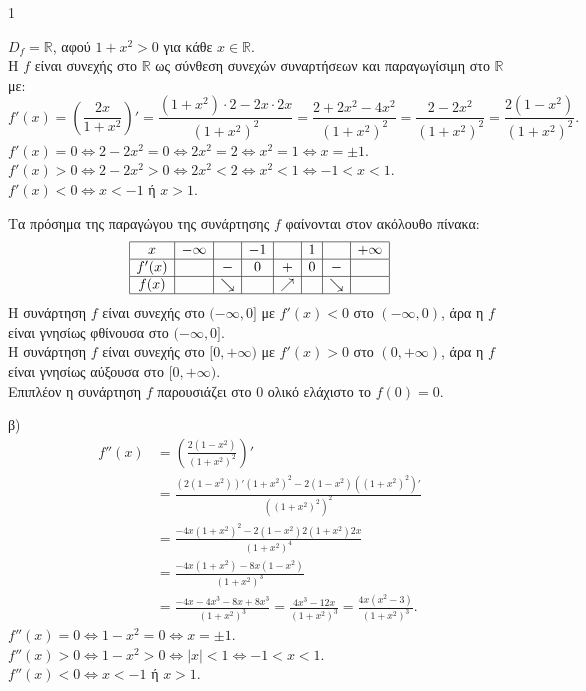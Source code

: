\begin{ylh}{1}
    \item [Ύλη από εικόνα]
\end{ylh}
$D_f = \mathbb{R}$, αφού $1+x^2 > 0$ για κάθε $x \in \mathbb{R}$. \\
Η $f$ είναι συνεχής στο $\mathbb{R}$ ως σύνθεση συνεχών συναρτήσεων και παραγωγίσιμη στο $\mathbb{R}$ με:
\[
f'(x) = \left( \frac{2x}{1+x^2} \right)' = \frac{(1+x^2)\cdot 2 - 2x\cdot 2x}{(1+x^2)^2} = \frac{2+2x^2-4x^2}{(1+x^2)^2} = \frac{2-2x^2}{(1+x^2)^2} = \frac{2(1-x^2)}{(1+x^2)^2}.
\]
$f'(x)=0 \Leftrightarrow 2-2x^2=0 \Leftrightarrow 2x^2=2 \Leftrightarrow x^2=1 \Leftrightarrow x=\pm 1$. \\
$f'(x)>0 \Leftrightarrow 2-2x^2>0 \Leftrightarrow 2x^2<2 \Leftrightarrow x^2<1 \Leftrightarrow -1<x<1$. \\
$f'(x)<0 \Leftrightarrow x<-1$ ή $x>1$.

Τα πρόσημα της παραγώγου της συνάρτησης $f$ φαίνονται στον ακόλουθο πίνακα:
\[
\begin{array}{|c|c|c|c|c|c|c|c|}
\hline
x & -\infty & & -1 & & 1 & & +\infty \\
\hline
f'(x) & & - & 0 & + & 0 & - & \\
\hline
f(x) & & \searrow & ~ & \nearrow & ~ & \searrow & \\
\hline
\end{array}
\]
Η συνάρτηση $f$ είναι συνεχής στο $(-\infty, 0]$ με $f'(x) < 0$ στο $(-\infty, 0)$, άρα η $f$ είναι γνησίως φθίνουσα στο $(-\infty, 0]$. \\
Η συνάρτηση $f$ είναι συνεχής στο $[0, +\infty)$ με $f'(x) > 0$ στο $(0, +\infty)$, άρα η $f$ είναι γνησίως αύξουσα στο $[0, +\infty)$. \\
Επιπλέον η συνάρτηση $f$ παρουσιάζει στο $0$ ολικό ελάχιστο το $f(0)=0$.

\bigskip

β)
\begin{align*}
f''(x) &= \left( \frac{2(1-x^2)}{(1+x^2)^2} \right)' \\
&= \frac{(2(1-x^2))'(1+x^2)^2 - 2(1-x^2)((1+x^2)^2)'}{((1+x^2)^2)^2} \\
&= \frac{-4x(1+x^2)^2 - 2(1-x^2)2(1+x^2)2x}{(1+x^2)^4} \\
&= \frac{-4x(1+x^2) - 8x(1-x^2)}{(1+x^2)^3} \\
&= \frac{-4x-4x^3-8x+8x^3}{(1+x^2)^3} = \frac{4x^3-12x}{(1+x^2)^3} = \frac{4x(x^2-3)}{(1+x^2)^3}.
\end{align*}
$f''(x)=0 \Leftrightarrow 1-x^2=0 \Leftrightarrow x=\pm 1$. \\
$f''(x)>0 \Leftrightarrow 1-x^2>0 \Leftrightarrow |x|<1 \Leftrightarrow -1<x<1$. \\
$f''(x)<0 \Leftrightarrow x<-1$ ή $x>1$.

